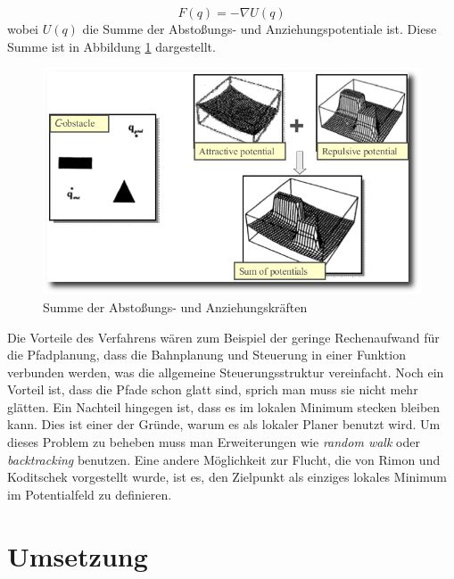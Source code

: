 \begin{equation}
F(q) = - \nabla U(q)
\end{equation}
wobei $U(q)$ die Summe der Abstoßungs- und Anziehungspotentiale ist.
Diese Summe ist in Abbildung \ref{fig:potentialfeld} dargestellt.

\begin{figure}[h]
\center
\includegraphics[scale=0.4]{graphics/potentialfeld.png}
\caption{\label{fig:potentialfeld} Summe der Abstoßungs- und Anziehungskräften \citep{innoKonz}}
\end{figure}

Die Vorteile des Verfahrens wären zum Beispiel der geringe Rechenaufwand für die Pfadplanung, dass die Bahnplanung und Steuerung in einer Funktion verbunden werden\citep{mobileRobotics}, was die allgemeine Steuerungsstruktur vereinfacht.
Noch ein Vorteil ist, dass die Pfade schon glatt sind, sprich man muss sie nicht mehr glätten.
Ein Nachteil hingegen ist, dass es im lokalen Minimum stecken bleiben kann.
Dies ist einer der Gründe, warum es als lokaler Planer benutzt wird.
Um dieses Problem zu beheben muss man Erweiterungen wie  \textit{random walk} oder \textit{backtracking} benutzen.
Eine andere Möglichkeit zur Flucht, die von Rimon und Koditschek vorgestellt wurde, ist es, den Zielpunkt als einziges lokales Minimum im Potentialfeld zu definieren.




\section{Umsetzung}
\label{bahnplanung_umsetzung_sec}


